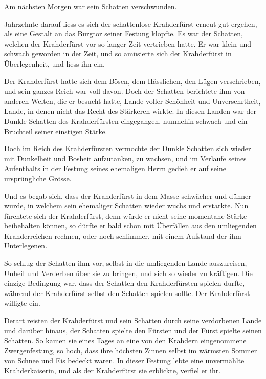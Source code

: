 \documentclass[10pt, a4paper, oneside]{book}
\begin{document}
Am nächsten Morgen war sein Schatten verschwunden.\bigskip



Jahrzehnte darauf liess es sich der schattenlose Krahderfürst erneut gut ergehen, als eine Gestalt an das Burgtor seiner Festung klopfte. Es war der Schatten, welchen der Krahderfürst vor so langer Zeit vertrieben hatte. Er war klein und schwach geworden in der Zeit, und so amüsierte sich der Krahderfürst in Überlegenheit, und liess ihn ein.

Der Krahderfürst hatte sich dem Bösen, dem Hässlichen, den Lügen verschrieben, und sein ganzes Reich war voll davon. Doch der Schatten berichtete ihm von anderen Welten, die er besucht hatte, Lande voller Schönheit und Unversehrtheit, Lande, in denen nicht das Recht des Stärkeren wirkte. In diesen Landen war der Dunkle Schatten des Krahderfürsten eingegangen, nunmehin schwach und ein Bruchteil seiner einstigen Stärke.

Doch im Reich des Krahderfürsten vermochte der Dunkle Schatten sich wieder mit Dunkelheit und Bosheit aufzutanken, zu wachsen, und im Verlaufe seines Aufenthalts in der Festung seines ehemaligen Herrn gedieh er auf seine ursprüngliche Grösse.

Und es begab sich, dass der Krahderfürst in dem Masse schwächer und dünner wurde, in welchem sein ehemaliger Schatten wieder wuchs und erstarkte. Nun fürchtete sich der Krahderfürst, denn würde er nicht seine momentane Stärke beibehalten können, so dürfte er bald schon mit Überfällen aus den umliegenden Krahderreichen rechnen, oder noch schlimmer, mit einem Aufstand der ihm Unterlegenen.

So schlug der Schatten ihm vor, selbst in die umliegenden Lande auszureisen, Unheil und Verderben über sie zu bringen, und sich so wieder zu kräftigen. Die einzige Bedingung war, dass der Schatten den Krahderfürsten spielen durfte, während der Krahderfürst selbst den Schatten spielen sollte. Der Krahderfürst willigte ein.\bigskip



Derart reisten der Krahderfürst und sein Schatten durch seine verdorbenen Lande und darüber hinaus, der Schatten spielte den Fürsten und der Fürst spielte seinen Schatten. So kamen sie eines Tages an eine von den Krahdern eingenommene Zwergenfestung, so hoch, dass ihre höchsten Zinnen selbst im wärmsten Sommer von Schnee und Eis bedeckt waren. In dieser Festung lebte eine unvermählte Krahderkaiserin, und als der Krahderfürst sie erblickte, verfiel er ihr.
\end{document}
